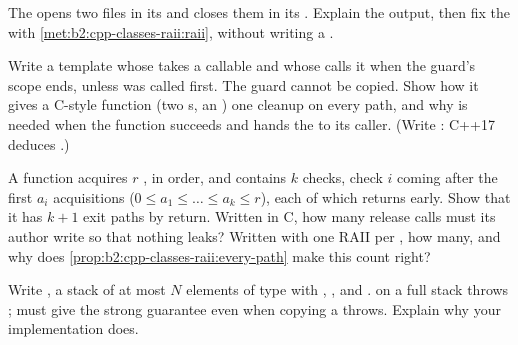 \begin{exercise}[$\star\star$]\label{exo:b2:cpp-classes-raii:6}
The   opens two files in its  and closes them in its . Explain the output,
then fix the  with \cref{met:b2:cpp-classes-raii:raii}, without writing a .
\end{exercise}

\begin{exercise}[$\star\star$]\label{exo:b2:cpp-classes-raii:7}
Write a  template  whose  takes a callable  and whose 
calls it when the guard's scope ends, unless  was called first. The guard cannot be copied. Show how
it gives a C-style function (two s, an ) one cleanup on every path, and why
 is needed when the function succeeds and hands the  to its caller. (Write
: C++17 deduces .)
\end{exercise}

\begin{exercise}[$\star\star$]\label{exo:b2:cpp-classes-raii:8}
A function acquires $r$ , in order, and contains $k$ checks, check $i$ coming after the first $a_i$
acquisitions ($0 \le a_1 \le \dots \le a_k \le r$), each of which returns early. Show that it has $k + 1$ exit paths
by return. Written in C, how many release calls must its author write so that nothing leaks? Written with one
RAII  per , how many, and why does \cref{prop:b2:cpp-classes-raii:every-path} make this count right?
\end{exercise}

\begin{exercise}[$\star\star$]\label{exo:b2:cpp-classes-raii:9}
Write , a stack of at most $N$ elements of type  with , ,
 and .  on a full stack throws ;  must give the
strong guarantee even when copying a  throws. Explain why your implementation does.
\end{exercise}

